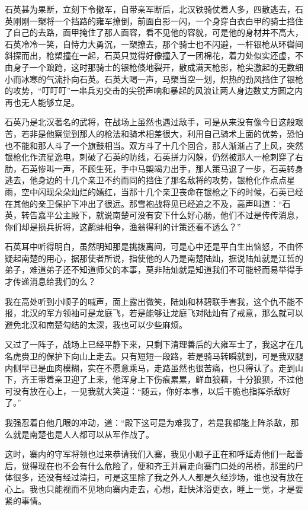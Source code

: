 石英甚为果断，立刻下令撤军，自带亲军断后，北汉铁骑仗着人多，四散逃去，石英刚刚一槊将一个挡路的雍军撩倒，前面白影一闪，一个身穿白衣白甲的骑士挡住了自己的去路，面甲掩住了那人面容，看不见他的容貌，可是他的身材并不高大，石英冷冷一笑，自恃力大勇沉，一槊撩去，那个骑士也不闪避，一杆银枪从环辔间斜探而出，枪槊撞在一起，石英只觉得好像撞入了一团棉花，着力处似实还虚，不由身子一个踉跄，这时那骑士的银枪倏地裂开，散成满天枪影，枪尖激起的无数细小而冰寒的气流扑向石英。石英大喝一声，马槊当空一划，炽热的劲风挡住了银枪的攻势，“叮叮叮”一串兵刃交击的尖锐声响和暴起的风浪让两人身边数丈方圆之内再也无人能够立足。

石英乃是北汉著名的武将，在战场上虽然也遇过敌手，可是从来没有像今日这般艰苦，若非是他察觉到那人的枪法和骑术相差很大，利用自己骑术上面的优势，恐怕也不能和那人斗了一个旗鼓相当。双方斗了十几个回合，那人渐渐占了上风，突然银枪化作流星逸电，刺破了石英的防线，石英拼力闪躲，仍然被那人一枪刺穿了右肋，石英惨叫一声，不顾生死，手中马槊竭力出手，那人策马退了一步，石英转身逃去，他身边的十几个亲卫不约而同的挡住了那名敌将的攻势，银枪化作点点星雨，空中闪现朵朵灿烂的嫣红，当那十几个亲卫丧命在银枪之下的时候，石英已经在其他的亲卫保护下冲出了很远。那雪袍战将见已经追之不及，高声叫道：“石英，转告嘉平公主殿下，就说南楚可没有安下什么好心肠，他们不过是传传消息，你们却是损兵折将，这鹬蚌相争，渔翁得利的计策还看不透么？”

石英耳中听得明白，虽然明知那是挑拨离间，可是心中还是平白生出恼怒，不由怀疑起南楚的用心，据那使者所说，指使他的人乃是南楚陆灿，据说陆灿就是江哲的弟子，难道弟子还不知道师父的本事，莫非陆灿就是知道我们不可能轻而易举得手才传递消息给我们的么？

我在高处听到小顺子的喊声，面上露出微笑，陆灿和林碧联手害我，这个仇不能不报，北汉的军方领袖可是龙庭飞，若是能够让龙庭飞对陆灿有了戒意，那么就可以避免北汉和南楚勾结的太深，我也可以少些麻烦。

又过了一阵子，战场上已经平静下来，只剩下清理善后的大雍军士了，我这才在几名虎赍卫的保护下向山上走去。只有短短一段路，若是骑马转瞬就到，可是我双腿内侧早已是血肉模糊，实在不愿意乘马，走路虽然也很苦痛，也只得认了。走到山下，齐王带着亲卫迎了上来，他浑身上下伤痕累累，鲜血狼藉，十分狼狈，不过他可没有放在心上，一见我就大笑道：“随云，你好本事，以后干脆也指挥杀敌好了。”

我强忍着白他几眼的冲动，道：“殿下这可是为难我了，若是我都能上阵杀敌，那么就是南楚也是人人都可以从军作战了。

这时，寨内的守军将领也过来恭请我们入寨，我见小顺子正在和呼延寿他们一起善后，觉得现在也不会有什么危险了，便和齐王并肩走向寨门口处的吊桥，那里的尸体很多，还没有经过清扫，可是这里除了我之外人人都是久经沙场，谁也没有放在心上。我也只能视而不见地向寨内走去，心想，赶快沐浴更衣，睡上一觉，才是要紧的事情。

